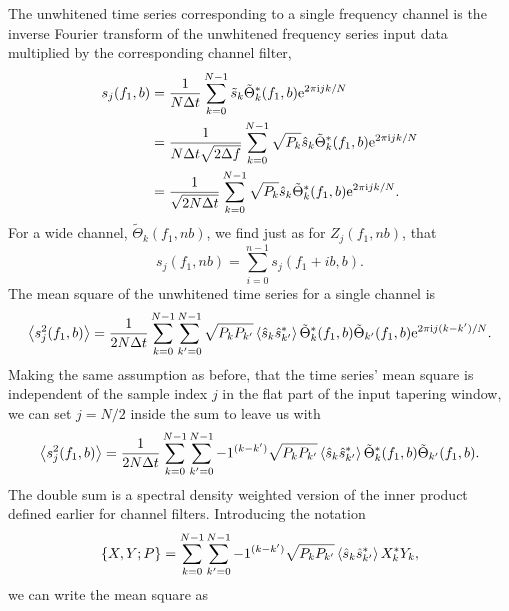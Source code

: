 \documentclass{article}
\begin{document}
The unwhitened time series corresponding to a single frequency channel is
the inverse Fourier transform of the unwhitened frequency series input data
multiplied by the corresponding channel filter,
\begin{align}
s_{j}(f_{1}, b)
   & = \frac{1}{N \Delta t} \sum_{k = 0}^{N - 1} \tilde{s}_{k}
   \tilde{\Theta}^{*}_{k}(f_{1}, b) \mathrm{e}^{2 \pi \mathrm{i} j k / N}
   \\
   & = \frac{1}{N \Delta t \sqrt{2 \Delta f}} \sum_{k = 0}^{N - 1}
   \sqrt{P_{k}} \hat{s}_{k} \tilde{\Theta}^{*}_{k}(f_{1}, b) \mathrm{e}^{2 \pi
   \mathrm{i} j k / N}
   \\
\label{eqn7}
   & = \frac{1}{\sqrt{2 N \Delta t}} \sum_{k = 0}^{N - 1} \sqrt{P_{k}}
   \hat{s}_{k} \tilde{\Theta}^{*}_{k}(f_{1}, b) \mathrm{e}^{2 \pi \mathrm{i} j k /
   N}.
\end{align}
For a wide channel, \(\tilde{\Theta}_{k}(f_{1}, n b)\), we find just as for
\(Z_{j}(f_{1}, n b)\), that
\begin{equation}
s_{j}(f_{1}, n b)
   = \sum_{i = 0}^{n - 1} s_{j}(f_{1} + i b, b).
\end{equation}
The mean square of the unwhitened time series for a single channel is
\begin{equation}
\left\langle s_{j}^{2}(f_{1}, b)\right\rangle
   = \frac{1}{2 N \Delta t} \sum_{k = 0}^{N - 1} \sum_{k' = 0}^{N - 1}
   \sqrt{P_{k} P_{k'}} \left\langle\hat{s}_{k} \hat{s}^{*}_{k'}\right\rangle
   \tilde{\Theta}^{*}_{k}(f_{1}, b) \tilde{\Theta}_{k'}(f_{1}, b)
   \mathrm{e}^{2 \pi \mathrm{i} j (k - k') / N}.
\end{equation}
Making the same assumption as before, that the time series' mean square is
independent of the sample index \(j\) in the flat part of the input
tapering window, we can set \(j = N / 2\) inside the sum to leave us with
\begin{equation}
\left\langle s_{j}^{2}(f_{1}, b)\right\rangle
   = \frac{1}{2 N \Delta t} \sum_{k = 0}^{N - 1} \sum_{k' = 0}^{N - 1}
   -1^{(k - k')} \sqrt{P_{k} P_{k'}} \left\langle\hat{s}_{k} \hat{s}^{*}_{k'}\right\rangle
   \tilde{\Theta}^{*}_{k}(f_{1}, b) \tilde{\Theta}_{k'}(f_{1}, b).
\end{equation}
The double sum is a spectral density weighted version of the inner product
defined earlier for channel filters.  Introducing the notation
\begin{equation}
\left\{ X, Y; P \right\}
   = \sum_{k = 0}^{N - 1} \sum_{k' = 0}^{N - 1} -1^{(k - k')} \sqrt{P_{k}
   P_{k'}} \left\langle\hat{s}_{k} \hat{s}^{*}_{k'}\right\rangle X^{*}_{k} Y_{k},
\end{equation}
we can write the mean square as
\end{document}
